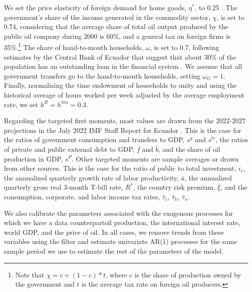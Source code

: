 \documentclass[12pt]{article}
\begin{document}
We set the price elasticity of foreign demand for home goods, $\eta^*$, to 0.25 \citep[see the estimates in][]{crespo2004estimacion, pelaez2020elasticidades}. The government's share of the income generated in the commodity sector, $\chi$, is set to 0.74, considering that the average share of total oil output produced by the public oil company during 2000 is 60\%, and a general tax on foreign firms is 35\%.\footnote{Note that $\chi= c + (1-c)*t$, where $c$ is the share of production owned by the government and $t$ is the average tax rate on foreign oil producers.} The share of hand-to-mouth households, $\omega$, is set to 0.7, following estimates by the Central Bank of Ecuador that suggest that about 30\% of the population has an outstanding loan in the financial system \citep[see][]{BCE2023EIF}. We assume that all government transfers go to the hand-to-mouth households, setting $\omega_G=1$. Finally, normalizing the time endowment of households to unity and using the historical average of hours worked per week adjusted by the average employment rate, we set $h^R=h^{hm}=0.3$.

Regarding the targeted first moments, most values are drawn from the 2022-2027 projections in the July 2022 IMF Staff Report for Ecuador \citep[see][]{oner2022imf}. This is the case for the ratios of government consumption and transfers to GDP, $s^g$ and $s^{tr}$, the ratios of private and public external debt to GDP, $\bar{f}$ and $\bar{b}$, and the share of oil production in GDP, $s^P$. Other targeted moments are sample averages or drawn from other sources. This is the case for the ratio of public to total investment, $i_r$, the annualized quarterly growth rate of labor productivity, $\bar{a}$, the annualized quarterly gross real 3-month T-bill rate, $R^*$, the country risk premium, $\bar{\xi}$, and the consumption, corporate, and labor income tax rates, $\bar{\tau}_c$, $\bar{\tau}_k$, $\bar{\tau}_n$.

We also calibrate the parameters associated with the exogenous processes for which we have a data counterpart\textemdash oil production, the international interest rate, world GDP, and the price of oil. In all cases, we remove trends from these variables using the \citet{hodrick1997filter} filter and estimate univariate AR(1) processes for the same sample period we use to estimate the rest of the parameters of the model.
\end{document}
